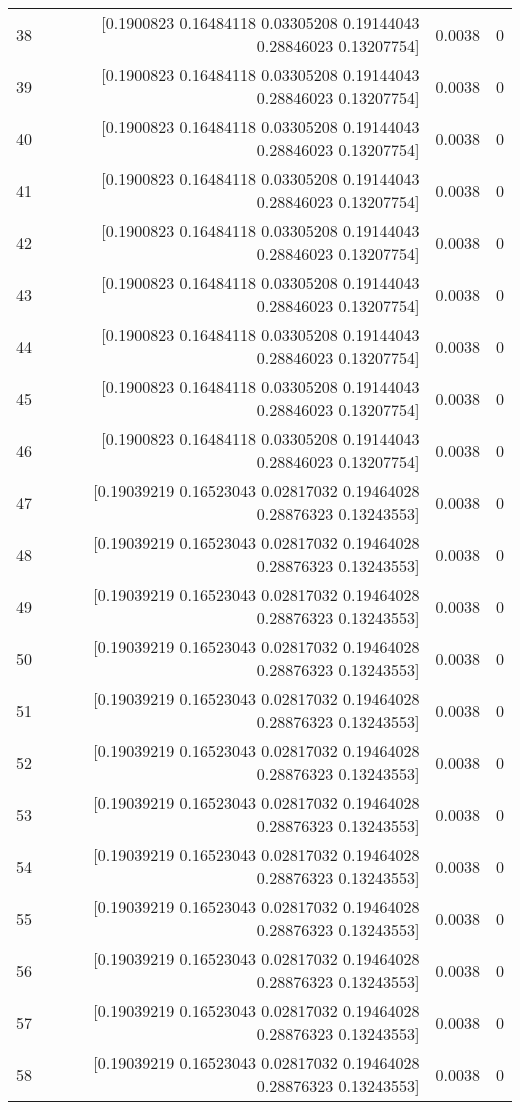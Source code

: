 \begin{longtable}{lrrr}
38 & [0.1900823  0.16484118 0.03305208 0.19144043 0.28846023 0.13207754] & 0.0038 & 0 \\
39 & [0.1900823  0.16484118 0.03305208 0.19144043 0.28846023 0.13207754] & 0.0038 & 0 \\
40 & [0.1900823  0.16484118 0.03305208 0.19144043 0.28846023 0.13207754] & 0.0038 & 0 \\
41 & [0.1900823  0.16484118 0.03305208 0.19144043 0.28846023 0.13207754] & 0.0038 & 0 \\
42 & [0.1900823  0.16484118 0.03305208 0.19144043 0.28846023 0.13207754] & 0.0038 & 0 \\
43 & [0.1900823  0.16484118 0.03305208 0.19144043 0.28846023 0.13207754] & 0.0038 & 0 \\
44 & [0.1900823  0.16484118 0.03305208 0.19144043 0.28846023 0.13207754] & 0.0038 & 0 \\
45 & [0.1900823  0.16484118 0.03305208 0.19144043 0.28846023 0.13207754] & 0.0038 & 0 \\
46 & [0.1900823  0.16484118 0.03305208 0.19144043 0.28846023 0.13207754] & 0.0038 & 0 \\
47 & [0.19039219 0.16523043 0.02817032 0.19464028 0.28876323 0.13243553] & 0.0038 & 0 \\
48 & [0.19039219 0.16523043 0.02817032 0.19464028 0.28876323 0.13243553] & 0.0038 & 0 \\
49 & [0.19039219 0.16523043 0.02817032 0.19464028 0.28876323 0.13243553] & 0.0038 & 0 \\
50 & [0.19039219 0.16523043 0.02817032 0.19464028 0.28876323 0.13243553] & 0.0038 & 0 \\
51 & [0.19039219 0.16523043 0.02817032 0.19464028 0.28876323 0.13243553] & 0.0038 & 0 \\
52 & [0.19039219 0.16523043 0.02817032 0.19464028 0.28876323 0.13243553] & 0.0038 & 0 \\
53 & [0.19039219 0.16523043 0.02817032 0.19464028 0.28876323 0.13243553] & 0.0038 & 0 \\
54 & [0.19039219 0.16523043 0.02817032 0.19464028 0.28876323 0.13243553] & 0.0038 & 0 \\
55 & [0.19039219 0.16523043 0.02817032 0.19464028 0.28876323 0.13243553] & 0.0038 & 0 \\
56 & [0.19039219 0.16523043 0.02817032 0.19464028 0.28876323 0.13243553] & 0.0038 & 0 \\
57 & [0.19039219 0.16523043 0.02817032 0.19464028 0.28876323 0.13243553] & 0.0038 & 0 \\
58 & [0.19039219 0.16523043 0.02817032 0.19464028 0.28876323 0.13243553] & 0.0038 & 0 \\

\end{longtable}
